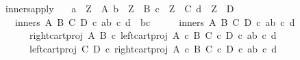\begin{isabellebody}
\ inners{\isacharunderscore}{\kern0pt}apply{\isacharcolon}{\kern0pt}\isanewline
\ \ \ {\isachardoublequoteopen}a\ {\isacharcolon}{\kern0pt}\ Z\ {\isasymrightarrow}\ A{\isachardoublequoteclose}\ {\isachardoublequoteopen}b\ {\isacharcolon}{\kern0pt}\ Z\ {\isasymrightarrow}\ B{\isachardoublequoteclose}\ {\isachardoublequoteopen}c\ {\isacharcolon}{\kern0pt}\ Z\ {\isasymrightarrow}\ C{\isachardoublequoteclose}\ {\isachardoublequoteopen}d\ {\isacharcolon}{\kern0pt}\ Z\ {\isasymrightarrow}\ D{\isachardoublequoteclose}\isanewline
\ \ \ {\isachardoublequoteopen}inners\ A\ B\ C\ D\ {\isasymcirc}\isactrlsub c\ {\isasymlangle}{\isasymlangle}a{\isacharcomma}{\kern0pt}b{\isasymrangle}{\isacharcomma}{\kern0pt}\ {\isasymlangle}c{\isacharcomma}{\kern0pt}\ d{\isasymrangle}{\isasymrangle}\ {\isacharequal}{\kern0pt}\ {\isasymlangle}b{\isacharcomma}{\kern0pt}c{\isasymrangle}{\isachardoublequoteclose}\isanewline
%
\isadelimproof
%
\endisadelimproof
%
\isatagproof
{}\isamarkupfalse%
\ {\isacharminus}{\kern0pt}\isanewline
\ \ \isamarkupfalse%
\ {\isachardoublequoteopen}inners\ A\ B\ C\ D\ {\isasymcirc}\isactrlsub c\ {\isasymlangle}{\isasymlangle}a{\isacharcomma}{\kern0pt}b{\isasymrangle}{\isacharcomma}{\kern0pt}\ {\isasymlangle}c{\isacharcomma}{\kern0pt}\ d{\isasymrangle}{\isasymrangle}\ {\isacharequal}{\kern0pt}\ {\isasymlangle}\isanewline
\ \ \ \ \ \ right{\isacharunderscore}{\kern0pt}cart{\isacharunderscore}{\kern0pt}proj\ A\ B\ {\isasymcirc}\isactrlsub c\ left{\isacharunderscore}{\kern0pt}cart{\isacharunderscore}{\kern0pt}proj\ {\isacharparenleft}{\kern0pt}A\ {\isasymtimes}\isactrlsub c\ B{\isacharparenright}{\kern0pt}\ {\isacharparenleft}{\kern0pt}C\ {\isasymtimes}\isactrlsub c\ D{\isacharparenright}{\kern0pt}\ {\isasymcirc}\isactrlsub c\ {\isasymlangle}{\isasymlangle}a{\isacharcomma}{\kern0pt}b{\isasymrangle}{\isacharcomma}{\kern0pt}\ {\isasymlangle}c{\isacharcomma}{\kern0pt}\ d{\isasymrangle}{\isasymrangle}{\isacharcomma}{\kern0pt}\isanewline
\ \ \ \ \ \ left{\isacharunderscore}{\kern0pt}cart{\isacharunderscore}{\kern0pt}proj\ C\ D\ {\isasymcirc}\isactrlsub c\ right{\isacharunderscore}{\kern0pt}cart{\isacharunderscore}{\kern0pt}proj\ {\isacharparenleft}{\kern0pt}A\ {\isasymtimes}\isactrlsub c\ B{\isacharparenright}{\kern0pt}\ {\isacharparenleft}{\kern0pt}C\ {\isasymtimes}\isactrlsub c\ D{\isacharparenright}{\kern0pt}\ {\isasymcirc}\isactrlsub c\ {\isasymlangle}{\isasymlangle}a{\isacharcomma}{\kern0pt}b{\isasymrangle}{\isacharcomma}{\kern0pt}\ {\isasymlangle}c{\isacharcomma}{\kern0pt}\ d{\isasymrangle}{\isasymrangle}{\isasymrangle}{\isachardoublequoteclose}\isanewline

\end{isabellebody}
